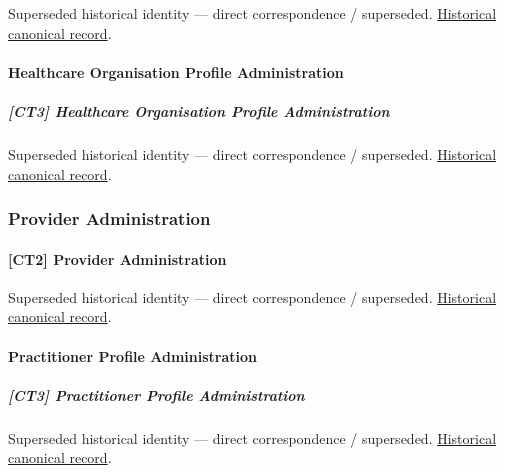 \par\label{element:1b0eacfbb27d4631a24f9279dab6681d}
Superseded historical identity — direct correspondence / superseded. \href{../../../../continuum/strategy/capability/1b0eacfbb27d4631a24f9279dab6681d.md}{Historical canonical record}.\par

\paragraph{Healthcare Organisation Profile Administration}

\subparagraph{[CT3] Healthcare Organisation Profile Administration}

\par\label{element:e485424b799c42aca7399d341ca02d0b}
Superseded historical identity — direct correspondence / superseded. \href{../../../../continuum/strategy/capability/e485424b799c42aca7399d341ca02d0b.md}{Historical canonical record}.\par

\subsubsection{Provider Administration}

\paragraph{[CT2] Provider Administration}

\par\label{element:a352fd50419d451887c85fcb98566cd5}
Superseded historical identity — direct correspondence / superseded. \href{../../../../continuum/strategy/capability/a352fd50419d451887c85fcb98566cd5.md}{Historical canonical record}.\par

\paragraph{Practitioner Profile Administration}

\subparagraph{[CT3] Practitioner Profile Administration}

\par\label{element:2415ddcbc73c47e1a63be310bd4342ee}
Superseded historical identity — direct correspondence / superseded. \href{../../../../continuum/strategy/capability/2415ddcbc73c47e1a63be310bd4342ee.md}{Historical canonical record}.\par

